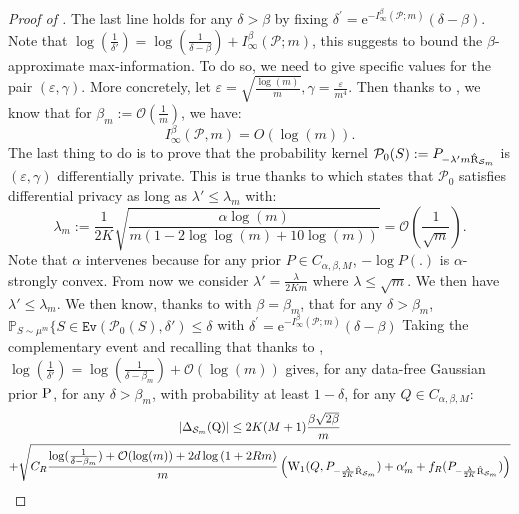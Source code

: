 \begin{proof}[Proof of ]
The last line holds for any $\delta > \beta$ by fixing $\delta^{\prime}=\mathrm{e}^{-I_{\infty}^\beta(\mathcal{P} ; m)}(\delta-\beta)$.
Note that $\log\left(\frac{1}{\delta'}   \right) = \log\left(\frac{1}{\delta - \beta}   \right) + I_{\infty}^\beta(\mathcal{P} ; m)$, this suggests to bound the $\beta$-approximate max-information. To do so, we need to give specific values for the pair $(\varepsilon,\gamma)$.
More concretely, let $\varepsilon= \sqrt{\frac{\log(m)}{m}}, \gamma= \frac{\varepsilon}{m^4}$.
Then thanks to , we know that for $\beta_m := \mathcal{O}(\frac{1}{m})$, we have:
\begin{equation}
\label{eq: rogers_bound}
I_{\infty}^\beta(\mathcal{P}, m)=O\left(\log(m) \right) .
\end{equation}
The last thing to do is to prove that the probability kernel $\mathcal{P}_0(S):= P_{-\lambda' m \Riskhat_{\Sm}}$ is $(\varepsilon,\gamma)$ differentially private. This is true thanks to  which states that $\mathcal{P}_0$ satisfies differential privacy as long as $\lambda' \leq \lambda_{m}$ with:
\begin{equation}
\label{eq: inv_temp}
\lambda_m:= \frac{1}{2K}\sqrt{\frac{\alpha \log(m)}{m\left(1-2\log\log(m) +10\log(m) \right)}} = \mathcal{O}\left(\frac{1}{\sqrt{m}}\right).
\end{equation}
Note that $\alpha$ intervenes because for any prior $P\in C_{\alpha,\beta,M}$, $-\log P(.)$ is $\alpha$-strongly convex.
From now we consider $\lambda'= \frac{\lambda}{2Km}$ where $\lambda \leq \sqrt{m}$. We then have $\lambda' \leq \lambda_m$.
We then know, thanks to  with $\beta=\beta_m$, that for any $\delta > \beta_m$,  $\mathbb{P}_{S \sim \mu^m}\{S \in \texttt{Ev}(\mathcal{P}_0(S),\delta') \leq \delta$
with $\delta^{\prime}=\mathrm{e}^{-I_{\infty}^\beta(\mathcal{P} ; m)}(\delta-\beta)$
Taking the complementary event and recalling that thanks to , $\log\left(\frac{1}{\delta'}   \right) = \log\left(\frac{1}{\delta - \beta_m}   \right) + \mathcal{O}(\log(m))$ gives,
for any data-free Gaussian prior $\P$, for any $\delta > \beta_m$, with probability at least $1-\delta$, for any $Q\in C_{\alpha,\beta,M}$:
\begin{multline}
\label{eq: complete_data_dep}
|\Delta_{\Sm}(\Q)| \leq 2K(M+1)\frac{\beta\sqrt{2\beta}}{m} \\
+\sqrt{ C_R \frac{\log(\frac{1}{\delta-\beta_m}) + \mathcal{O}(\log(m)) +2d\log\left(1 +2Rm \right)}{m} \left(\W_{1}( Q, P_{-\frac{\lambda}{2K} \Riskhat_{\Sm}})+\alpha'_m + f_R(P_{-\frac{\lambda}{2K} \Riskhat_{\Sm}}) \right) }  \\

\end{multline}
\end{proof}
